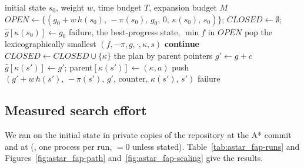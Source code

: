 \begin{algorithm}[htbp]
\caption{Weighted A* as implemented in }
\label{alg:astar_fap-astar}
\begin{algorithmic}[1]
\Require initial state $s_0$, weight $w$, time budget $T$, expansion budget $M$
\State $\mathit{OPEN}\gets\{(g_0+w\,h(s_0),\,-\pi(s_0),\,g_0,\,0,\,\kappa(s_0),\,s_0)\}$;
       $\mathit{CLOSED}\gets\emptyset$; $\hat g[\kappa(s_0)]\gets g_0$
    \State \Return failure, the best-progress state, $\min f$ in $\mathit{OPEN}$
  \EndIf
  \State pop the lexicographically smallest $(f,-\pi,g,\cdot,\kappa,s)$
   \textbf{continue} 
  \EndIf
  \State $\mathit{CLOSED}\gets\mathit{CLOSED}\cup\{\kappa\}$
   \Return the plan by parent pointers \EndIf
   
    \State $g'\gets g+c$
      \State $\hat g[\kappa(s')]\gets g'$; parent$[\kappa(s')]\gets(\kappa,a)$
      \State push $(g'+w\,h(s'),\,-\pi(s'),\,g',\,\text{counter},\,\kappa(s'),\,s')$
    \EndIf
  \EndFor
\EndWhile
\State \Return failure
\end{algorithmic}
\end{algorithm}

\subsection{Measured search effort}
\label{sec:astar_fap-effort}

We ran  on the initial state in private copies of the repository at the A*
commit  and at  (, one process per run,
$=0$ unless stated). Table~\ref{tab:astar_fap-runs} and
Figures~\ref{fig:astar_fap-path} and~\ref{fig:astar_fap-scaling} give the results.

